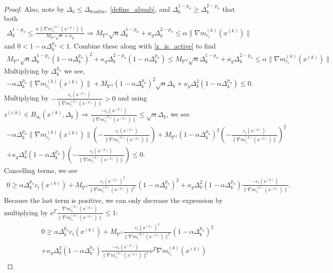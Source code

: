 \documentclass{article}
\theoremstyle{case}
\numberwithin{theorem}{subsection}
\newcommand{\dfeas}{{\Delta_{\textrm{feasible}}}}
\newcommand{\dk}{\Delta_k}
\newcommand{\gmcik}{{\nabla m_{c_i}^{(k)}\left(\xk\right)}}
\newcommand{\maxhessian}{{M_{\nabla^2}}}
\newcommand{\tr}{{ B_{\infty}\left(\xk, \dk\right) }}
\newcommand{\xk}{x^{(k)}}
\newcommand{\zik}{{z^{(i, k)}}}
\begin{document}
\begin{proof}
Also, note by $\dk \le \dfeas$, \cref{define_abpab}, and $\dk^{1 - p_{\alpha}} \ge \dk^{2 - p_{\alpha}}$ that both
\begin{align*}
\dk^{1-p_{\alpha}} \le \frac{\alpha \|\gmcik\|}{\maxhessian \sqrt{n} + \kappa_g} 
\Longrightarrow \maxhessian \sqrt{n}\dk^{1- p_{\alpha}} + \kappa_g \dk^{2 - p_{\alpha}} \le \alpha \|\gmcik\|
\end{align*}
and $0 < 1 - \alpha \dk^{p_{\alpha}} < 1$.
Combine these along with \cref{z_is_active} to find 
\begin{align*}
\maxhessian \sqrt{n}\dk^{1-p_{\alpha}}\left(1 - \alpha \dk^{p_{\alpha}}\right)^2  + \kappa_g \dk^{2 - p_{\alpha}} \left(1 - \alpha \dk^{p_{\alpha}}\right)
\le \maxhessian \sqrt{n}\dk^{1 - p_{\alpha}} + \kappa_g \dk^{2 - p_{\alpha}} \le \alpha \|\gmcik\|
\end{align*}
Multiplying by $\dk^{p_{\alpha}}$ we see,
\begin{align*}
-\alpha \dk^{p_{\alpha}}\|\gmcik\| + \maxhessian \left(1 - \alpha \dk^{p_{\alpha}}\right)^2 \sqrt{n}\dk+ \kappa_g \dk^2 \left(1 - \alpha \dk^{p_{\alpha}}\right) \le  0.
\end{align*}
Multiplying by $-\frac{c_i(\xk)}{\|\gmcik\|} > 0$ and using $\zik \in \tr \Longrightarrow \frac{-c_i(\xk)}{\|\gmcik\|} \le \sqrt{n}\dk$, we see
\begin{align*}
-\alpha \dk^{p_{\alpha}}\|\gmcik\|\left(-\frac{c_i(\xk)}{\|\gmcik\|}\right) + \maxhessian \left(1 - \alpha \dk^{p_{\alpha}}\right)^2 \left(-\frac{c_i(\xk)}{\|\gmcik\|}\right)^2\\
+\kappa_g \dk^2 \left(1 - \alpha \dk^{p_{\alpha}}\right)\left(-\frac{c_i(\xk)}{\|\gmcik\|}\right) \le 0.
\end{align*}
Cancelling terms, we see
\begin{align*}
0 \ge \alpha \dk^{p_{\alpha}} c_i(\xk) + \maxhessian \frac {c_i(\xk)^2}{\|\gmcik\|^2}\left(1 - \alpha \dk^{p_{\alpha}}\right)^2 + \kappa_g \dk^2 \left(1 - \alpha \dk^{p_{\alpha}}\right)\frac{-c_i(\xk)}{\|\gmcik\|}.
\end{align*}
Because the last term is positive, we can only decrease the expression by multiplying by $\nu^T \frac{\gmcik}{\|\gmcik\|} \le 1$:
\begin{align*}
0\ge \alpha \dk^{p_{\alpha}} c_i(\xk) + \maxhessian \frac {c_i(\xk)^2}{\|\gmcik\|^2}\left(1 - \alpha \dk^{p_{\alpha}}\right)^2  \\
+ \kappa_g \dk^2 \left(1 - \alpha \dk^{p_{\alpha}}\right)\frac{-c_i(\xk)}{\|\gmcik\|^2}\nu^T\gmcik
\end{align*}

\end{proof}
\end{document}
